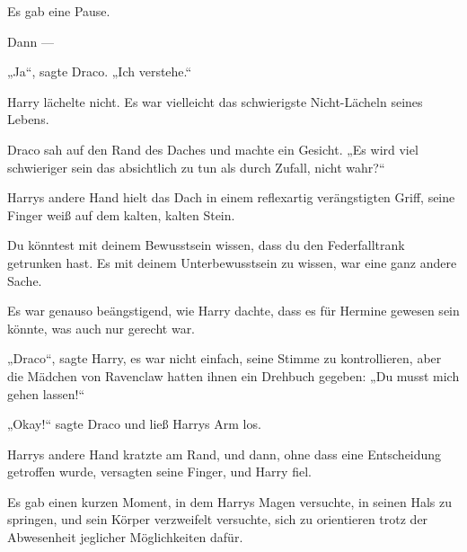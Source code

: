 Es gab eine Pause.

Dann —

„Ja“, sagte Draco.
„Ich verstehe.“

Harry lächelte nicht. Es war vielleicht das schwierigste Nicht-Lächeln seines Lebens.

Draco sah auf den Rand des Daches und machte ein Gesicht.
„Es wird viel schwieriger sein das absichtlich zu tun als durch Zufall, nicht wahr?“

\later

Harrys andere Hand hielt das Dach in einem reflexartig verängstigten Griff, seine Finger weiß auf dem kalten, kalten Stein.

Du könntest mit deinem Bewusstsein wissen, dass du den Federfalltrank getrunken hast. Es mit deinem Unterbewusstsein zu wissen, war eine ganz andere Sache.

Es war genauso beängstigend, wie Harry dachte, dass es für Hermine gewesen sein könnte, was auch nur gerecht war.

„Draco“, sagte Harry, es war nicht einfach, seine Stimme zu kontrollieren, aber die Mädchen von Ravenclaw hatten ihnen ein Drehbuch gegeben:
„Du musst mich gehen lassen!“

„Okay!“ sagte Draco und ließ Harrys Arm los.

Harrys andere Hand kratzte am Rand, und dann, ohne dass eine Entscheidung getroffen wurde, versagten seine Finger, und Harry fiel.

Es gab einen kurzen Moment, in dem Harrys Magen versuchte, in seinen Hals zu springen, und sein Körper verzweifelt versuchte, sich zu orientieren trotz der Abwesenheit jeglicher Möglichkeiten dafür.

